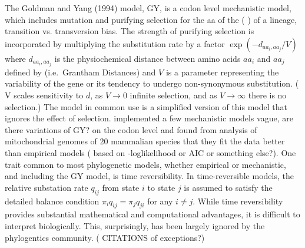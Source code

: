 The Goldman and Yang (1994) model, GY, is a  codon level mechanistic model, which includes mutation and purifying selection for the aa of the ( ) of a lineage, transition vs. transversion bias. The strength of purifying selection is incorporated by multiplying the substitution rate by a factor $\exp (- d_{aa_i,aa_j}/V)$ where $d_{aa_i, aa_j}$ is the physiochemical distance between amino acids $aa_i$ and $aa_j$ defined by \citet{grantham1974} (i.e.~Grantham Distances) and $V$ is a parameter representing the variability of the gene or its tendency to undergo non-synonymous substitution. ({\color{blue} V scales sensitivity to $d$, as $V \rightarrow 0$ infinite selection, and as $V \rightarrow \infty$ there is no selection.})
The model in common use is a simplified version of this model that ignores the effect of selection.
\citet{yang1998models} implemented a few mechanistic models {\color{blue} vague, are there variations of GY?} on the codon level and found from analysis of mitochondrial genomes of 20 mammalian species that they fit the data better than empirical models ({\color{blue} based on -loglikelihood or AIC or something else?}). 
One trait common to most phylogenetic models, whether empirical or mechanistic, and including the GY model, is time reversibility. 
In time-reversible models, the relative substation rate $q_{ij}$ from state $i$ to state $j$ is assumed to satisfy the detailed balance condition $\pi_{i} q_{ij} = \pi_j q_{ji}$ for any $i \ne j$.
While time reversibility provides substantial mathematical and computational advantages, it is difficult to interpret biologically. This, surprisingly, has been largely ignored by the phylogentics community. ({\color{blue} CITATIONS of exceptions?})



